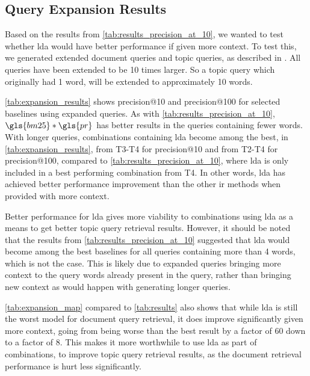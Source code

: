 \subsection{Query Expansion Results}

Based on the results from \autoref{tab:results_precision_at_10}, we wanted to test whether \gls{lda} would have better performance if given more context.
To test this, we generated extended document queries and topic queries, as described in .
All queries have been extended to be 10 times larger. 
So a topic query which originally had 1 word, will be extended to approximately 10 words.

\autoref{tab:expansion_results} shows precision@10 and precision@100 for selected baselines using expanded queries.
As with \autoref{tab:results_precision_at_10}, $\gls{bm25} * \gls{pr}$ has better results in the queries containing fewer words.
With longer queries, combinations containing \gls{lda} become among the best, in \autoref{tab:expansion_results}, from T3-T4 for precision@10 and from T2-T4 for precision@100, compared to \autoref{tab:results_precision_at_10}, where \gls{lda} is only included in a best performing combination from T4.
In other words, \gls{lda} has achieved better performance improvement than the other \gls{ir} methods when provided with more context.

Better performance for \gls{lda} gives more viability to combinations using \gls{lda} as a means to get better topic query retrieval results.
However, it should be noted that the results from \autoref{tab:results_precision_at_10} suggested that \gls{lda} would become among the best baselines for all queries containing more than 4 words, which is not the case.
This is likely due to expanded queries bringing more context to the query words already present in the query, rather than bringing new context as would happen with generating longer queries.

\autoref{tab:expansion_map} compared to \autoref{tab:results} also shows that while \gls{lda} is still the worst model for document query retrieval, it does improve significantly given more context, going from being worse than the best result by a factor of 60 down to a factor of 8.
This makes it more worthwhile to use \gls{lda} as part of combinations, to improve topic query retrieval results, as the document retrieval performance is hurt less significantly.  


